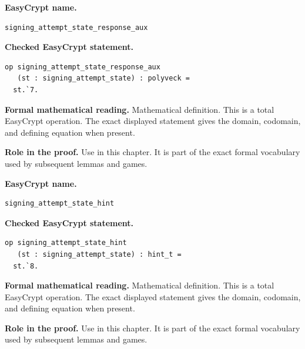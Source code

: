 \begin{formaldefinition}
\noindent\textbf{EasyCrypt name.}
\begin{lstlisting}[language=EasyCrypt,basicstyle=\ttfamily\scriptsize]
signing_attempt_state_response_aux
\end{lstlisting}
\noindent\textbf{Checked EasyCrypt statement.}
\begin{lstlisting}[language=EasyCrypt,basicstyle=\ttfamily\scriptsize]
op signing_attempt_state_response_aux
   (st : signing_attempt_state) : polyveck =
  st.`7.
\end{lstlisting}
\noindent\textbf{Formal mathematical reading.}
Mathematical definition. This is a total EasyCrypt operation.  The exact displayed statement gives the domain, codomain, and defining equation when present.

\noindent\textbf{Role in the proof.}
Use in this chapter. It is part of the exact formal vocabulary used by subsequent lemmas and games.

\end{formaldefinition}

\begin{formaldefinition}
\noindent\textbf{EasyCrypt name.}
\begin{lstlisting}[language=EasyCrypt,basicstyle=\ttfamily\scriptsize]
signing_attempt_state_hint
\end{lstlisting}
\noindent\textbf{Checked EasyCrypt statement.}
\begin{lstlisting}[language=EasyCrypt,basicstyle=\ttfamily\scriptsize]
op signing_attempt_state_hint
   (st : signing_attempt_state) : hint_t =
  st.`8.
\end{lstlisting}
\noindent\textbf{Formal mathematical reading.}
Mathematical definition. This is a total EasyCrypt operation.  The exact displayed statement gives the domain, codomain, and defining equation when present.

\noindent\textbf{Role in the proof.}
Use in this chapter. It is part of the exact formal vocabulary used by subsequent lemmas and games.

\end{formaldefinition}


